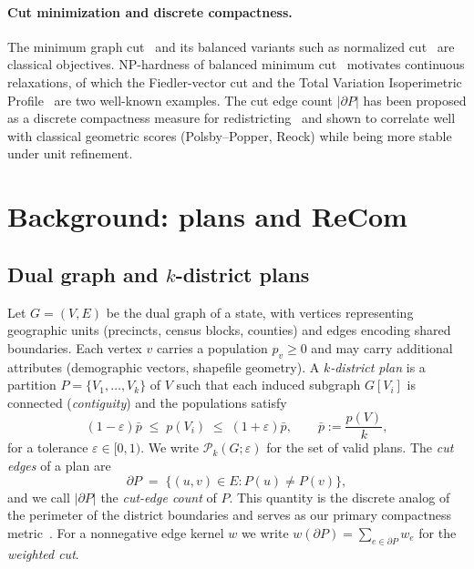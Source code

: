 \documentclass[11pt]{article}
\begin{document}
\paragraph{Cut minimization and discrete compactness.}\label{sec:related-cut}

The minimum graph cut~\cite{stoer1997simple,karger2000minimum} and its
balanced variants such as normalized cut~\cite{shi2000normalized} are
classical objectives. NP-hardness of balanced minimum
cut~\cite{wagner1993between} motivates continuous relaxations, of
which the Fiedler-vector cut and the Total Variation Isoperimetric
Profile~\cite{deford2019total} are two well-known examples. The cut
edge count $|\partial P|$ has been proposed as a discrete compactness
measure for redistricting~\cite{duchin2018discrete} and shown to
correlate well with classical geometric scores (Polsby--Popper, Reock)
while being more stable under unit refinement.

\section{Background: plans and ReCom}\label{sec:background}

\subsection{Dual graph and \texorpdfstring{$k$}{k}-district plans}\label{sec:background-graph}

Let $G = (V, E)$ be the dual graph of a state, with vertices
representing geographic units (precincts, census blocks, counties) and
edges encoding shared boundaries. Each vertex $v$ carries a population
$p_v \ge 0$ and may carry additional attributes (demographic vectors,
shapefile geometry). A \emph{$k$-district plan} is a partition
$P = \{V_1, \ldots, V_k\}$ of $V$ such that each induced subgraph
$G[V_i]$ is connected (\emph{contiguity}) and the populations satisfy
\begin{equation}\label{eq:pop-balance}
  (1 - \varepsilon)\bar p \;\le\; p(V_i) \;\le\; (1 + \varepsilon)\bar p,
  \qquad \bar p := \frac{p(V)}{k},
\end{equation}
for a tolerance $\varepsilon \in [0, 1)$. We write $\mathcal{P}_k(G; \varepsilon)$
for the set of valid plans. The \emph{cut edges} of a plan are
\[
  \partial P \;=\; \{(u,v) \in E : P(u) \ne P(v)\},
\]
and we call $|\partial P|$ the \emph{cut-edge count} of $P$. This
quantity is the discrete analog of the perimeter of the district
boundaries and serves as our primary compactness
metric~\cite{duchin2018discrete}. For a nonnegative edge kernel $w$ we
write $w(\partial P) = \sum_{e \in \partial P} w_e$ for the
\emph{weighted cut}.
\end{document}
